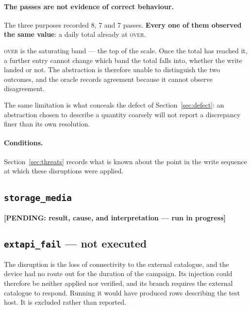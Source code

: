 \documentclass[11pt,a4paper]{article}
\newcommand{\PENDING}[1]{\textcolor{warn}{\textbf{[PENDING: #1]}}}
\newcommand{\gate}[1]{\texttt{\small #1}}
\begin{document}
\paragraph{The passes are not evidence of correct behaviour.}
The three purposes recorded 8, 7 and 7 passes. \textbf{Every one of them observed
the same value}: a daily total already at \textsc{over}.

\textsc{over} is the saturating band --- the top of the scale. Once the total has
reached it, a further entry cannot change which band the total falls into,
whether the write landed or not. The abstraction is therefore unable to
distinguish the two outcomes, and the oracle records agreement because it cannot
observe disagreement.

\medskip
\noindent{}

\medskip
\noindent The same limitation is what conceals the defect of
Section~\ref{sec:defect}: an abstraction chosen to describe a quantity coarsely
will not report a discrepancy finer than its own resolution.

\paragraph{Conditions.}
Section~\ref{sec:threats} records what is known about the point in the write
sequence at which these disruptions were applied.

\subsection{\gate{storage\_media}}
\PENDING{result, cause, and interpretation --- run in progress}

\subsection{\gate{extapi\_fail} --- not executed}
The disruption is the loss of connectivity to the external catalogue, and the
device had no route out for the duration of the campaign. Its injection could
therefore be neither applied nor verified, and its branch requires the external
catalogue to respond. Running it would have produced rows describing the test
host. It is excluded rather than reported.
\end{document}
